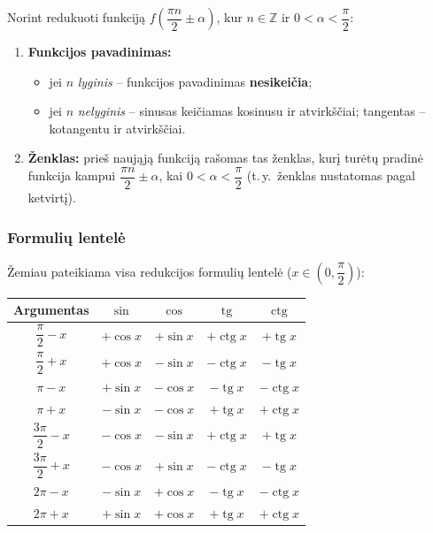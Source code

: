 \begin{tcolorbox}[colback=red!5!white, colframe=red!60!black,
    title=Redukcijos taisyklė (universali formuluotė)]
Norint redukuoti funkciją $f\!\left(\dfrac{\pi n}{2} \pm \alpha\right)$,
kur $n \in \mathbb{Z}$ ir $0 < \alpha < \dfrac{\pi}{2}$:
\begin{enumerate}
  \item \textbf{Funkcijos pavadinimas:}
    \begin{itemize}
      \item jei $n$ \emph{lyginis} -- funkcijos pavadinimas \textbf{nesikeičia};
      \item jei $n$ \emph{nelyginis} -- sinusas keičiamas kosinusu ir
            atvirkščiai; tangentas -- kotangentu ir atvirkščiai.
    \end{itemize}
  \item \textbf{Ženklas:} prieš naująją funkciją rašomas tas ženklas, kurį
    turėtų pradinė funkcija kampui $\dfrac{\pi n}{2} \pm \alpha$, kai
    $0 < \alpha < \dfrac{\pi}{2}$ (t.\,y.\ ženklas nustatomas pagal ketvirtį).
\end{enumerate}
\end{tcolorbox}

\subsubsection*{Formulių lentelė}

Žemiau pateikiama visa redukcijos formulių lentelė ($x \in
\left(0,\dfrac{\pi}{2}\right)$):

\begin{center}
\renewcommand{\arraystretch}{2}
\begin{tabular}{|c|c|c|c|c|}
  \hline
  \textbf{Argumentas} & $\sin$ & $\cos$ & $\operatorname{tg}$ & $\operatorname{ctg}$ \\
  \hline
  $\dfrac{\pi}{2} - x$ & $+\cos x$ & $+\sin x$ & $+\operatorname{ctg}x$ & $+\operatorname{tg}x$ \\
  \hline
  $\dfrac{\pi}{2} + x$ & $+\cos x$ & $-\sin x$ & $-\operatorname{ctg}x$ & $-\operatorname{tg}x$ \\
  \hline
  $\pi - x$ & $+\sin x$ & $-\cos x$ & $-\operatorname{tg}x$ & $-\operatorname{ctg}x$ \\
  \hline
  $\pi + x$ & $-\sin x$ & $-\cos x$ & $+\operatorname{tg}x$ & $+\operatorname{ctg}x$ \\
  \hline
  $\dfrac{3\pi}{2} - x$ & $-\cos x$ & $-\sin x$ & $+\operatorname{ctg}x$ & $+\operatorname{tg}x$ \\
  \hline
  $\dfrac{3\pi}{2} + x$ & $-\cos x$ & $+\sin x$ & $-\operatorname{ctg}x$ & $-\operatorname{tg}x$ \\
  \hline
  $2\pi - x$ & $-\sin x$ & $+\cos x$ & $-\operatorname{tg}x$ & $-\operatorname{ctg}x$ \\
  \hline
  $2\pi + x$ & $+\sin x$ & $+\cos x$ & $+\operatorname{tg}x$ & $+\operatorname{ctg}x$ \\
  \hline
\end{tabular}
\end{center}

